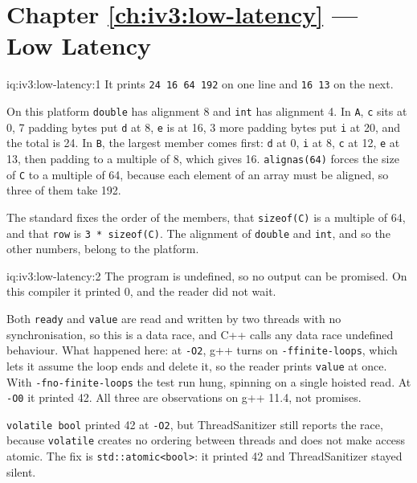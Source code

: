 \section*{Chapter \ref{ch:iv3:low-latency} --- Low Latency}

\begin{solution}{iq:iv3:low-latency:1}
It prints \texttt{24 16 64 192} on one line and \texttt{16 13} on the next.

On this platform \texttt{double} has alignment 8 and \texttt{int} has alignment 4. In \texttt{A}, \texttt{c} sits at 0, 7 padding bytes put \texttt{d} at 8, \texttt{e} is at 16, 3 more padding bytes put \texttt{i} at 20, and the total is 24. In \texttt{B}, the largest member comes first: \texttt{d} at 0, \texttt{i} at 8, \texttt{c} at 12, \texttt{e} at 13, then padding to a multiple of 8, which gives 16. \texttt{alignas(64)} forces the size of \texttt{C} to a multiple of 64, because each element of an array must be aligned, so three of them take 192.

The standard fixes the order of the members, that \texttt{sizeof(C)} is a multiple of 64, and that \texttt{row} is \texttt{3 * sizeof(C)}. The alignment of \texttt{double} and \texttt{int}, and so the other numbers, belong to the platform.

\end{solution}

\begin{solution}{iq:iv3:low-latency:2}
The program is undefined, so no output can be promised. On this compiler it printed 0, and the reader did not wait.

Both \texttt{ready} and \texttt{value} are read and written by two threads with no synchronisation, so this is a data race, and C++ calls any data race undefined behaviour. What happened here: at \texttt{-O2}, g++ turns on \texttt{-ffinite-loops}, which lets it assume the loop ends and delete it, so the reader prints \texttt{value} at once. With \texttt{-fno-finite-loops} the test run hung, spinning on a single hoisted read. At \texttt{-O0} it printed 42. All three are observations on g++ 11.4, not promises.

\texttt{volatile bool} printed 42 at \texttt{-O2}, but ThreadSanitizer still reports the race, because \texttt{volatile} creates no ordering between threads and does not make access atomic. The fix is \texttt{std::atomic<bool>}: it printed 42 and ThreadSanitizer stayed silent.

\end{solution}

